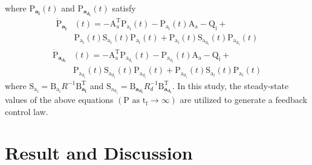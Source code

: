 \documentclass[conference]{IEEEtran}
\begin{document}
where $\boldsymbol{{\mathrm{P}}_{a_i}}(t)$ and $\boldsymbol{{\mathrm{P}}_{a_{d_i}}}(t)$ satisfy
\begin{equation}\label{coupled_riccatti_LQIDG}
        \begin{split}
            \boldsymbol{\dot{\mathrm{P}}_{a_i}}&(t) = -\boldsymbol{\mathrm{A^\mathrm{T}_a}}\boldsymbol{\mathrm{P_{a_i}}}(t) - \boldsymbol{\mathrm{P_{a_i}}}(t)\boldsymbol{\mathrm{A_a}} - \boldsymbol{\mathrm{Q_i}} +\\ &\boldsymbol{\mathrm{P_{a_i}}}(t)\boldsymbol{\mathrm{S_{a_i}}}(t)\boldsymbol{\mathrm{P_{a_i}}}(t) + \boldsymbol{\mathrm{P_{a_i}}}(t)\boldsymbol{\mathrm{S_{a_{d_i}}}}(t)\boldsymbol{\mathrm{P_{a_{d_i}}}}(t)
        \end{split}
	\end{equation}
	\begin{equation}
        \begin{split}
            \boldsymbol{\dot{\mathrm{P}}_{a_{d_i}}}&(t) = -\boldsymbol{\mathrm{A^\mathrm{T}_a}}\boldsymbol{\mathrm{P_{a_{d_i}}}}(t) - \boldsymbol{\mathrm{P_{a_{d_i}}}}(t)\boldsymbol{\mathrm{A_a}} - \boldsymbol{\mathrm{Q_{i}}} +\\ &\boldsymbol{\mathrm{P_{a_{d_i}}}}(t)\boldsymbol{\mathrm{S_{a_{d_i}}}}(t)\boldsymbol{\mathrm{P_{a_{d_i}}}}(t) + \boldsymbol{\mathrm{P_{a_{d_i}}}}(t)\boldsymbol{\mathrm{S_{a_i}}}(t)\boldsymbol{\mathrm{P_{a_i}}}(t)
        \end{split}
\end{equation}
where $\boldsymbol{\mathrm{S_{a_i}}} = \boldsymbol{\mathrm{B_{a_i}}}R^{-1}\boldsymbol{\mathrm{B}^\mathrm{T}_{a_i}}$ and $\boldsymbol{\mathrm{S_{a_{d_i}}}} = \boldsymbol{\mathrm{B}_{a_{d_i}}}R_{d}^{-1}\boldsymbol{\mathrm{B}^\mathrm{T}_{a_{d_i}}}$.
In this study, the steady-state values of the above equations $(\boldsymbol{{\mathrm{P}}} \text{ as } \mathrm{t_f} \to \infty)$ are utilized to generate a feedback control law.








\section{Result and Discussion}\label{sec:results}
\end{document}
